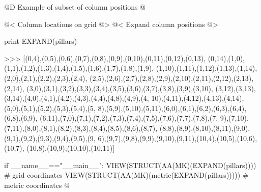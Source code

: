 \documentclass[11pt,oneside]{article}    %
\begin{document}
@D Example of subset of column positions  @{
@< Column locations on grid @>
@< Expand column positions @>

print EXPAND(pillars)

>>> [(0,4),(0,5),(0,6),(0,7),(0,8),(0,9),(0,10),(0,11),(0,12),(0,13),
(0,14),(1,0),(1,1),(1,2),(1,3),(1,4),(1,5),(1,6),(1,7),(1,8),(1,9),
(1,10),(1,11),(1,12),(1,13),(1,14),(2,0),(2,1),(2,2),(2,3),(2,4),
(2,5),(2,6),(2,7),(2,8),(2,9),(2,10),(2,11),(2,12),(2,13),(2,14),
(3,0),(3,1),(3,2),(3,3),(3,4),(3,5),(3,6),(3,7),(3,8),(3,9),(3,10),
(3,12),(3,13),(3,14),(4,0),(4,1),(4,2),(4,3),(4,4),(4,8),(4,9),(4,
10),(4,11),(4,12),(4,13),(4,14),(5,0),(5,1),(5,2),(5,3),(5,4),(5,
8),(5,9),(5,10),(5,11),(6,0),(6,1),(6,2),(6,3),(6,4),(6,8),(6,9),
(6,11),(7,0),(7,1),(7,2),(7,3),(7,4),(7,5),(7,6),(7,7),(7,8),(7,
9),(7,10),(7,11),(8,0),(8,1),(8,2),(8,3),(8,4),(8,5),(8,6),(8,7),
(8,8),(8,9),(8,10),(8,11),(9,0),(9,1),(9,2),(9,3),(9,4),(9,5),(9,
6),(9,7),(9,8),(9,9),(9,10),(9,11),(10,4),(10,5),(10,6),(10,7),
(10,8),(10,9),(10,10),(10,11)]

if __name__=="__main__":
    VIEW(STRUCT(AA(MK)(EXPAND(pillars)))) # grid coordinates
    VIEW(STRUCT(AA(MK)(metric(EXPAND(pillars))))) # metric coordinates
@}
\end{document}
